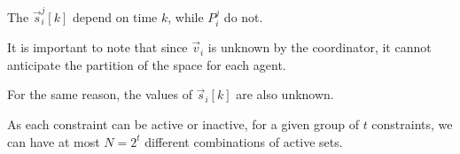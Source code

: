 \documentclass{ifacconf}  %
\begin{document}









\begin{remark}\label{rmk:P_constant}
The $\vec{s}_{i}^{j}[k]$ depend on time $k$, while $P_{i}^{j}$ do not.
\end{remark}


\begin{challenge}\label{ch:zone_unknown}
  It is important to note that since $\vec{v}_{i}$ is unknown by the coordinator, it cannot anticipate the partition of the space for each agent.
\end{challenge}
\begin{challenge}\label{ch:s_unknown}
 For the same reason, the values of $\vec{s}_{i}[k]$ are also unknown.
\end{challenge}

 As each constraint can be active or inactive, for a given group of $t$ constraints, we can have at most $N=2^{t}$ different combinations of active sets.
\end{document}
